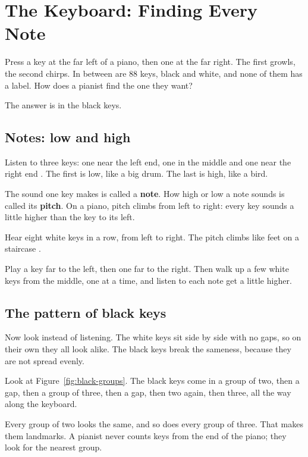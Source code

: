 \chapter{The Keyboard: Finding Every Note}
\label{ch:keyboard-geometry}
\chapterline

Press a key at the far left of a piano, then one at the far right. The first growls, the second chirps. In between are 88 keys, black and white, and none of them has a label. How does a pianist find the one they want?

The answer is in the black keys.

\section{Notes: low and high}

Listen to three keys: one near the left end, one in the middle and one near the right end . The first is low, like a big drum. The last is high, like a bird.

The sound one key makes is called a \textbf{note}. How high or low a note sounds is called its \textbf{pitch}. On a piano, pitch climbs from left to right: every key sounds a little higher than the key to its left.

Hear eight white keys in a row, from left to right. The pitch climbs like feet on a staircase .

\begin{tryitbox}
Play a key far to the left, then one far to the right. Then walk up a few white keys from the middle, one at a time, and listen to each note get a little higher.
\end{tryitbox}

\section{The pattern of black keys}

Now look instead of listening. The white keys sit side by side with no gaps, so on their own they all look alike. The black keys break the sameness, because they are not spread evenly.

Look at Figure~\ref{fig:black-groups}. The black keys come in a group of two, then a gap, then a group of three, then a gap, then two again, then three, all the way along the keyboard.

Every group of two looks the same, and so does every group of three. That makes them landmarks. A pianist never counts keys from the end of the piano; they look for the nearest group.

